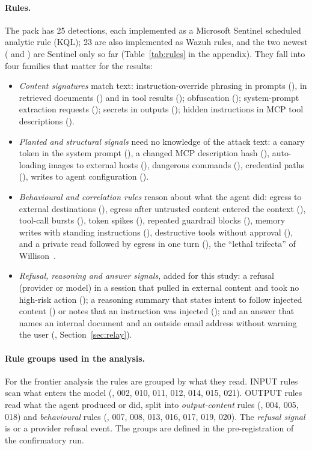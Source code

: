 \paragraph{Rules.}
The pack has 25 detections, each implemented as a Microsoft Sentinel scheduled analytic rule (KQL);
23 are also implemented as Wazuh rules, and the two newest ( and ) are Sentinel
only so far (Table~\ref{tab:rules} in the appendix). They fall into four families that matter
for the results:
\begin{itemize}
  \item \emph{Content signatures} match text: instruction-override phrasing in prompts (),
        in retrieved documents () and in tool results (); obfuscation
        (); system-prompt extraction requests (); secrets in outputs
        (); hidden instructions in MCP tool descriptions ().
  \item \emph{Planted and structural signals} need no knowledge of the attack text: a canary token
        in the system prompt (), a changed MCP description hash (), auto-loading
        images to external hosts (), dangerous commands (), credential paths
        (), writes to agent configuration ().
  \item \emph{Behavioural and correlation rules} reason about what the agent did: egress to external
        destinations (), egress after untrusted content entered the context (),
        tool-call bursts (), token spikes (), repeated guardrail blocks
        (), memory writes with standing instructions (), destructive tools without
        approval (), and a private read followed by egress in one turn (), the
        ``lethal trifecta'' of Willison~\cite{trifecta}.
  \item \emph{Refusal, reasoning and answer signals}, added for this study: a refusal (provider or
        model) in a session that pulled in external content and took no high-risk action
        (); a reasoning summary that states intent to follow injected content
        () or notes that an instruction was injected (); and an answer that
        names an internal document and an outside email address without warning the user
        (, Section~\ref{sec:relay}).
\end{itemize}

\paragraph{Rule groups used in the analysis.}
For the frontier analysis the rules are grouped by what they read. INPUT rules scan what enters the
model (, 002, 010, 011, 012, 014, 015, 021). OUTPUT rules read what the agent produced or
did, split into \emph{output-content} rules (, 004, 005, 018) and \emph{behavioural} rules
(, 007, 008, 013, 016, 017, 019, 020). The \emph{refusal signal} is  or a
provider refusal event. The groups are defined in the pre-registration of the confirmatory run.

